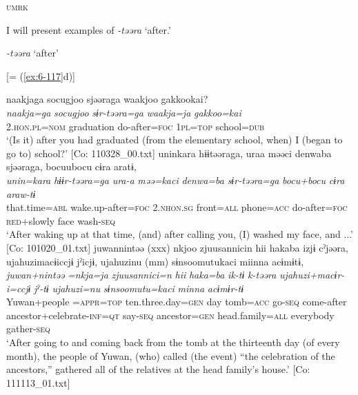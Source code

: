           \textsc{umrk}
\z

I will present examples of \textit{-təəra} ‘after.’

\ea\label{ex:8-100}
  \textit{-təəra} ‘after’

\ea {}[= (\ref{ex:6-117}d)]

{\TM}
\glll  naakjaga  {\textbar}socugjoo{\textbar}  sjəəraga  waakjoo  {\textbar}gakkoo{\textbar}kai?\\
\textit{naakja=ga}  \textit{socugjoo}  \textit{sɨr-təəra=ga}  \textit{waakja=ja}  \textit{gakkoo=kai}\\
2.\textsc{hon}.\textsc{pl}=\textsc{nom}  graduation  do-after=\textsc{foc}  1\textsc{pl}=\textsc{top}  school=\textsc{dub}\\
\glt ‘(Is it) after you had graduated (from the elementary school, when) I (began to go to) school?’ [Co: 110328\_00.txt]
\ex
{\TM}
\glll  uninkara  hɨɨtəəraga,  uraa  məəci  {\textbar}denwa{\textbar}ba   sjəəraga,  bocuubocu  cɨra  aratɨ,\\
\textit{unin=kara}  \textit{hɨɨr-təəra=ga}  \textit{ura-a}  \textit{məə=kaci}  \textit{denwa=ba}      \textit{sɨr-təəra=ga}  \textit{bocu+bocu}  \textit{cɨra}  \textit{araw-tɨ}\\
that.time=\textsc{abl}  wake.up-after=\textsc{foc}  2.\textsc{nhon}.\textsc{sg}  front=\textsc{all}  phone=\textsc{acc}  do-after=\textsc{foc}  \textsc{red}+slowly  face  wash-\textsc{seq}\\
\glt ‘After waking up at that time, (and) after calling you, (I) washed my face, and ...’ [Co: 101020\_01.txt]
\ex
{\TM}
\glll  juwannintəə  (xxx)  nkjoo  {\textbar}zjuusannici{\textbar}n  hii    hakaba  izjɨ  cˀjəəra,  ujahuzimacɨiccjɨ  jˀicjɨ,    ujahuzinu  (mm)  sɨnsoomutukaci  miinna  acɨmɨtɨ,\\
\textit{juwan+nintəə}    \textit{=nkja=ja}  \textit{zjuusannici=n}  \textit{hii}   \textit{haka=ba}  \textit{ik-tɨ}  \textit{k-təəra}  \textit{ujahuzi+macɨr-i=ccjɨ}  \textit{jˀ-tɨ}   \textit{ujahuzi=nu}    \textit{sɨnsoomutu=kaci}  \textit{minna}  \textit{acɨmɨr-tɨ}\\
Yuwan+people    =\textsc{appr}=\textsc{top}  ten.three.day=\textsc{gen}  day   tomb=\textsc{acc}  go-\textsc{seq}  come-after  ancestor+celebrate-\textsc{inf}=\textsc{qt}  say-\textsc{seq}    ancestor=\textsc{gen}    head.family=\textsc{all}  everybody  gather-\textsc{seq}\\
\glt ‘After going to and coming back from the tomb at the thirteenth day (of every month), the people of Yuwan, (who) called (the event) “the celebration of the ancestors,” gathered all of the relatives at the head family’s house.’ [Co: 111113\_01.txt]


